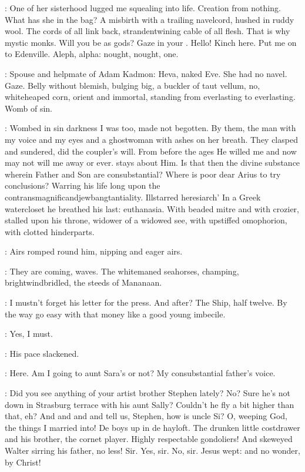 \StephenInt:
One of her sisterhood lugged me squealing into life.
Creation from nothing.
What has she in the bag?
A misbirth with a trailing navelcord,
hushed in ruddy wool.
The cords of all link back,
strandentwining cable of all flesh.
That is why mystic monks.
Will you be as gods?
Gaze in your
.
Hello!
Kinch here.
Put me on to Edenville.
Aleph, alpha:
nought, nought, one.

\StephenInt:
Spouse and helpmate of Adam Kadmon:
Heva, naked Eve.
She had no navel.
Gaze.
Belly without blemish, bulging big,
a buckler of taut vellum,
no, whiteheaped corn,
orient and immortal,
standing from everlasting to everlasting.
Womb of sin.

\StephenInt:
Wombed in sin darkness I was too, made not begotten.
By them, the man with my voice and my eyes
and a ghostwoman with ashes on her breath.
They clasped and sundered, did the coupler's will.
From before the ages
He willed me
and now may not will me away or ever.
 stays about Him.
Is that then the divine substance wherein Father and Son are consubstantial?
Where is poor dear Arius to try conclusions?
Warring his life long upon the contransmagnificandjewbangtantiality.
Illstarred heresiarch'
In a Greek watercloset he breathed his last:
euthanasia.
With beaded mitre and with crozier,
stalled upon his throne,
widower of a widowed see,
with upstiffed omophorion,
with clotted hinderparts.

:
Airs romped round him, nipping and eager airs.

\StephenInt:
They are coming,
waves.
The whitemaned seahorses, champing,
brightwindbridled,
the steeds of Mananaan.

\StephenInt:
I mustn't forget his letter for the press.
And after?
The Ship, half twelve.
By the way
go easy with that money like a good young imbecile.

\StephenInt:
Yes, I must.

:
His pace slackened.

\StephenInt:
Here.
Am I going to aunt Sara's or not?
My consubstantial father's voice.

\simon:
Did you see anything of your artist brother Stephen lately?
No?
Sure he's not down in Strasburg terrace with his aunt Sally?
Couldn't he fly a bit higher than that, eh?
And and and and tell us, Stephen,
how is uncle Si?
O, weeping God, the things I married into!
De boys up in de hayloft.
The drunken little costdrawer
and his brother, the cornet player.
Highly respectable gondoliers!
And skeweyed Walter sirring his father, no less!
Sir.
Yes, sir.
No, sir.
Jesus wept:
and no wonder, by Christ!


